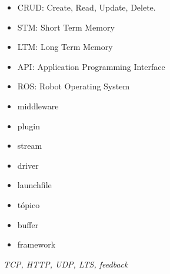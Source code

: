 \begin{glosario}\label{chapter:glosario}




\begin{itemize}
\item CRUD: Create, Read, Update, Delete.
\item STM: Short Term Memory
\item LTM: Long Term Memory
\item API: Application Programming Interface
\item ROS: Robot Operating System
\item middleware
\item plugin
\item stream
\item driver
\item launchfile
\item tópico
\item buffer
\item framework
\end{itemize}

\textit{TCP, HTTP, UDP, LTS, feedback}

\end{glosario}	
